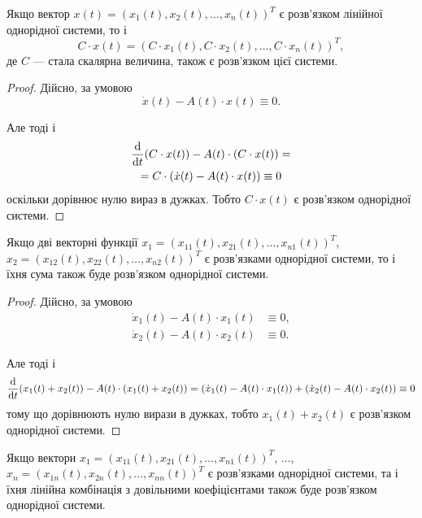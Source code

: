 \setcounter{property}{0}
\begin{property}
	Якщо вектор $x(t) = (x_1(t), x_2(t), \ldots, x_n(t))^T$ є розв'язком лінійної однорідної системи, то і \[ C \cdot x(t) = (C \cdot x_1(t), C \cdot x_2(t), \ldots, C \cdot x_n(t))^T,\] де $C$ --- стала скалярна величина, також є розв'язком цієї системи.
\end{property}

\begin{proof}
	Дійсно, за умовою 
	\begin{equation*}
		\dot x(t) - A(t) \cdot x(t) \equiv 0.
	\end{equation*}

	Але тоді і
	\begin{multline*}
		\frac{\mathop{}\!\mathrm{d}}{\mathop{}\!\mathrm{d} t} (C \cdot x(t)) - A(t) \cdot (C \cdot x(t)) = \\ = C \cdot (\dot x(t) - A(t) \cdot x(t)) \equiv 0
	\end{multline*}
	оскільки дорівнює нулю вираз в дужках. Тобто $C \cdot x(t)$ є розв'язком однорідної системи.
\end{proof}

\begin{property}
	Якщо дві векторні функції $x_1 = (x_{11}(t), x_{21}(t), \ldots, x_{n1}(t))^T$, $x_2 = (x_{12}(t), x_{22}(t), \ldots, x_{n2}(t))^T$ є розв'язками однорідної системи, то і їхня сума також буде розв’язком однорідної системи.
\end{property}

\begin{proof}
	Дійсно, за умовою
	\begin{align*}
		\dot x_1(t) - A(t) \cdot x_1(t) &\equiv 0, \\
		\dot x_2(t) - A(t) \cdot x_2(t) &\equiv 0.
	\end{align*}

	Але тоді і
	\begin{equation*}
		\frac{\mathop{}\!\mathrm{d}}{\mathop{}\!\mathrm{d} t} (x_1(t) + x_2(t)) - A(t) \cdot (x_1(t) + x_2(t)) = (\dot x_1(t) - A(t) \cdot x_1(t)) + (\dot x_2(t) - A(t) \cdot x_2(t)) \equiv 0
	\end{equation*}
	тому що дорівнюють нулю вирази в дужках, тобто $x_1(t) + x_2(t)$ є розв'язком однорідної системи.
\end{proof}

\begin{property}
	Якщо вектори $x_1 = (x_{11}(t), x_{21}(t), \ldots, x_{n1}(t))^T$, $\ldots$, $x_n = (x_{1n}(t), x_{2n}(t), \ldots, x_{nn}(t))^T$ є розв'язками однорідної системи, та і їхня лінійна комбінація з довільними коефіцієнтами також буде розв'язком однорідної системи. 
\end{property}

